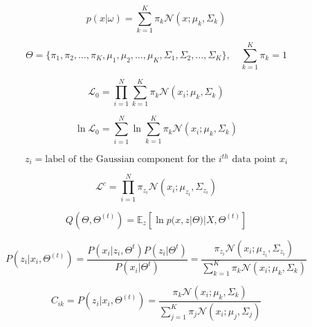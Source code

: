 \documentclass[10pt]{article}
\begin{document}
\begin{multicols}{2}
\begin{equation*}
    p(x | \omega) = \sum_{k=1}^{K} \pi_{k} \mathcal{N}(x ; \mu_{k}, \Sigma_{k})
\end{equation*}

\begin{equation*}
    \Theta = \{ \pi_{1}, \pi_{2}, \ldots, \pi_{K}, \mu_{1}, \mu_{2}, \ldots, \mu_{K}, \Sigma_{1}, \Sigma_{2}, \ldots, \Sigma_{K} \}, \quad \sum_{k=1}^{K} \pi_{k} = 1
\end{equation*}


\begin{equation*} \label{eq:observed-likelihood}
    \mathcal{L}_0 = \prod_{i=1}^{N} \sum_{k=1}^{K} \pi_{k} \mathcal{N}(x_i ; \mu_{k}, \Sigma_{k})
\end{equation*}

\begin{equation*} \label{eq:log-likelihood}
    \ln \mathcal{L}_0 = \sum_{i=1}^{N} \ln \sum_{k=1}^{K} \pi_{k} \mathcal{N}(x_i ; \mu_{k}, \Sigma_{k})
\end{equation*}

\begin{equation*} \label{eq:hidden-latent}
    z_{i} = \text{label of the Gaussian component for the $i^{th}$ data point $x_i$}
\end{equation*}
    
\begin{equation*}
    \mathcal{L}^c = \prod_{i=1}^{N} \pi_{z_{i}} \mathcal{N}(x_i ; \mu_{z_{i}}, \Sigma_{z_{i}})
\end{equation*}

\begin{equation*}
    Q(\Theta, \Theta^{(t)}) = \mathbb{E}_{z}[\ln p(x, z | \Theta) | X, \Theta^{(t)}]
\end{equation*}

\begin{equation*}
    P(z_{i} | x_{i}, \Theta^{(t)}) = \frac{P(x_i | z_i, \Theta^t) P(z_i | \Theta^t)}{P(x_i | \Theta^t)} = \frac{\pi_{z_{i}} \mathcal{N}(x_i ; \mu_{z_{i}}, \Sigma_{z_{i}})}{\sum_{k=1}^{K} \pi_{k} \mathcal{N}(x_i ; \mu_{k}, \Sigma_{k})} 
\end{equation*}

\begin{equation*}
    C_{ik} = P(z_i | x_i, \Theta^{(t)}) = \frac{\pi_{k} \mathcal{N}(x_i ; \mu_{k}, \Sigma_{k})}{\sum_{j=1}^{K} \pi_{j} \mathcal{N}(x_i ; \mu_{j}, \Sigma_{j})}
\end{equation*}


\end{multicols}
\end{document}
